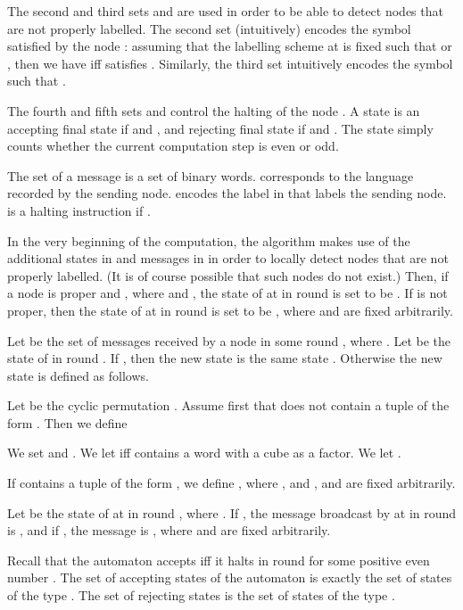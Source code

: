 \documentclass[copyright,creativecommons]{eptcs}
\begin{document}
The second and third sets  and  are used in order to be able to detect nodes that are not properly labelled.
The second set  (intuitively) encodes the symbol  satisfied by the node :
assuming that the labelling scheme at  is 
fixed such that  or
, then we have  iff  satisfies .
Similarly, the third set  intuitively encodes the symbol  such that .




The fourth and fifth sets  and  control the halting of the node .
A state  is an accepting final state if  and ,
and rejecting final state if  and .
The state  simply counts whether the current computation step is even or odd.




The set  of a message  is a
set of binary words.  corresponds to the language recorded by the sending node.
 encodes the label in  that labels the sending node.
 is a halting instruction if .




In the very beginning of the computation,
the algorithm makes use of the additional states in  
and messages in  in order to locally detect nodes that
are not properly labelled. (It is of course possible that such
nodes do not exist.)
Then, if a node  is proper and , where  and ,
the state of  at  in round 
is set to be .
If  is not proper, then the state of  at  in round  is
set to be , where  and  are fixed arbitrarily.




Let  be the set of messages received by a node  in some round ,
where .
Let  be the state of  in round .
If , then the new state is the same 
state .
Otherwise the new state  is defined as follows.




Let  be the cyclic permutation
.
Assume first that  does not contain a tuple of the form .
Then we define 

We set  and . We let  iff  contains a word with a cube as a factor.
We let .




If  contains a tuple of the form ,
we define ,
where , and ,  and  are fixed arbitrarily.




Let  be the state of  at  in round , where .
If , the  message
broadcast by  at  in round  is , and if , the
message is , where  and   are fixed arbitrarily.




Recall that the automaton  accepts iff it halts in round  for
some positive even number .
The set of accepting states of the automaton  is exactly the set
of states of the type .
The set of rejecting states is the set
of states of the type .
\end{document}
